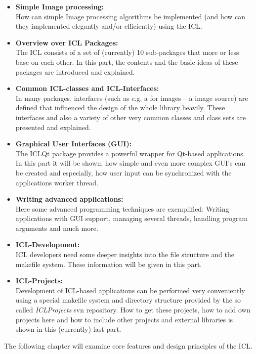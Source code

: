\begin{itemize}
\item \textbf{Simple Image processing:}\\ How can simple Image processing algorithms be implemented (and how can they implemented elegantly and/or efficiently) using the ICL.
\item \textbf{Overview over ICL Packages:}\\ The ICL consists of a set of (currently) 10 sub-packages that more or less base on each other. In this part, the contents and the basic ideas of these packages are introduced and explained. 
\item \textbf{Common ICL-classes and ICL-Interfaces:}\\ In many packages, interfaces (such as e.g. a  for images -- a image source) are defined that influenced the design of the whole library heavily. These interfaces and also a variety of other very common classes and class sets are presented and explained.
\item \textbf{Graphical User Interfaces (GUI):}\\ The ICLQt package provides a powerful wrapper for Qt-based applications. In this part it will be shown, how simple and even more complex GUI's can be created and especially, how user input can be synchronized with the applications worker thread.
\item \textbf{Writing advanced applications:}\\ Here some advanced programming techniques are exemplified: Writing applications with GUI support, managing several threads, handling program arguments and much more.
\item \textbf{ICL-Development:}\\ICL developers need some deeper insights into the file structure and the makefile system. These information will be given in this part.
\item \textbf{ICL-Projects:}\\Development of ICL-based applications can be performed very conveniently using a special makefile system and directory structure provided by the so called \emph{ICLProjects} svn repository. How to get these projects, how to add own projects here and how to include other projects and external libraries is shown in this (currently) last part. 
\end{itemize} 


The following chapter will examine core features and design principles of the ICL.



